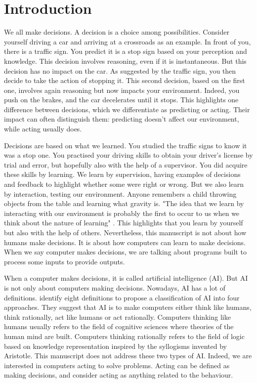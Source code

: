 \chapter{Introduction}\label{ch:introduction}

We all make decisions.
A decision is a choice among possibilities.
Consider yourself driving a car and arriving at a crossroads as an example.
In front of you, there is a traffic sign.
You predict it is a stop sign based on your perception and knowledge.
This decision involves reasoning, even if it is instantaneous.
But this decision has no impact on the car.
As suggested by the traffic sign, you then decide to take the action of stopping it.
This second decision, based on the first one, involves again reasoning but now impacts your environment.
Indeed, you push on the brakes, and the car decelerates until it stops.
This highlights one difference between decisions, which we differentiate as predicting or acting.
Their impact can often distinguish them: predicting doesn't affect our environment, while acting usually does.

Decisions are based on what we learned.
You studied the traffic signs to know it was a stop one.
You practised your driving skills to obtain your driver's license by trial and error, but hopefully also with the help of a supervisor.
You did acquire these skills by learning.
We learn by supervision, having examples of decisions and feedback to highlight whether some were right or wrong.
But we also learn by interaction, testing our environment.
Anyone remembers a child throwing objects from the table and learning what gravity is.
"The idea that we learn by interacting with our environment is probably the first to occur to us when we think about the nature of learning" \citep{sutton2018reinforcement}.
This highlights that you learn by yourself but also with the help of others.
Nevertheless, this manuscript is not about how humans make decisions. 
It is about how computers can learn to make decisions.
When we say computer makes decisions, we are talking about programs built to process some inputs to provide outputs.

When a computer makes decisions, it is called artificial intelligence (AI).
But AI is not only about computers making decisions.
Nowadays, AI has a lot of definitions.
\cite{russel2010} identify eight definitions to propose a classification of AI into four approaches.
They suggest that AI is to make computers either think like humans, think rationally, act like humans or act rationally.
Computers thinking like humans usually refers to the field of cognitive sciences where theories of the human mind are built.
Computers thinking rationally refers to the field of logic based on knowledge representation inspired by the syllogisms invented by Aristotle.
This manuscript does not address these two types of AI.
Indeed, we are interested in computers acting to solve problems.
Acting can be defined as making decisions, and \cite{russel2010} consider acting as anything related to the behaviour.

